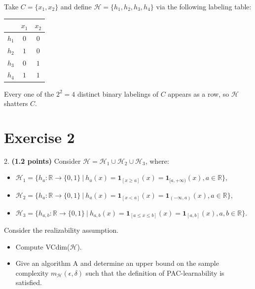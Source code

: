 \documentclass[12pt]{article}
\def\sone{{\textbf{1}}}
\begin{document}
Take $C = \{x_1, x_2\}$ and define $\mathcal{H} = \{h_1, h_2, h_3, h_4\}$ via the following labeling table:

\begin{center}
\begin{tabular}{c|cc}
    & $x_1$ & $x_2$ \\
\hline
$h_1$ & $0$ & $0$ \\
$h_2$ & $1$ & $0$ \\
$h_3$ & $0$ & $1$ \\
$h_4$ & $1$ & $1$ \\
\end{tabular}
\end{center}

\noindent Every one of the $2^2 = 4$ distinct binary labelings of $C$ appears as a row, so $\mathcal{H}$ shatters $C$.

\newpage
\section*{Exercise 2}

2. \textbf{(1.2 points)} Consider $\mathcal{H} = \mathcal{H}_1 \cup \mathcal{H}_2 \cup \mathcal{H}_3$, where:

\begin{itemize}
    \setlength{\itemindent}{-6mm}
    \item[] $\mathcal{H}_1 = \{h_{a} : \mathbb{R} \rightarrow \{0,1\} \ | \ h_{a}(x) = \sone_{[x \geq a]}(x) = \sone_{[a, +\infty)}(x), a \in \mathbb{R}\}$,
    \item[] $\mathcal{H}_2 = \{h_{a} : \mathbb{R} \rightarrow \{0,1\} \ | \ h_{a}(x) = \sone_{[x < a]}(x) = \sone_{(-\infty, a)}(x), a \in \mathbb{R}\}$,
    \item[] $\mathcal{H}_3 = \{h_{a, b} : \mathbb{R} \rightarrow \{0,1\} \ | \ h_{a, b}(x) = \sone_{[a \leq x \leq b]}(x) = \sone_{[a, b]}(x), a, b \in \mathbb{R}\}$.
\end{itemize}    

Consider the realizability assumption.

\begin{itemize}
    \item[a)] Compute VCdim($\mathcal{H}$).
    \item[b)] Give an algorithm A and determine an upper bound on the sample complexity $m_{\mathcal{H}}(\epsilon, \delta)$ such that the definition of PAC-learnability is satisfied.
    
\end{itemize}
\end{document}
